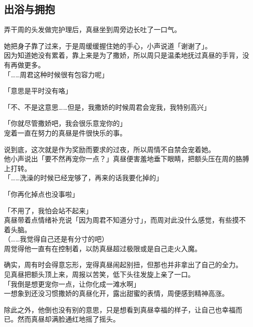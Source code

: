 \subsection{出浴与拥抱}

弄干周的头发做完护理后，真昼坐到周旁边长吐了一口气。

她把身子靠了过来，于是周缓缓握住她的手心，小声说道「谢谢了」。\\

因为知道她没有累着，靠上来是为了撒娇，所以周只是温柔地抚过真昼的手背，没有再做更多。\\

「……周君这种时候很有包容力呢」

「意思是平时没有咯」

「不、不是这意思……但是，我撒娇的时候周君会宠我，我特别高兴」

「你就尽管撒娇吧，我会很乐意宠你的」\\

宠着一直在努力的真昼是件很快乐的事。

说到底，这次就是作为奖励而要求的过夜，所以周情不自禁会宠着她。\\

他小声说出「要不然再宠你一点？」真昼便害羞地垂下眼睛，把额头压在周的胳膊上打转。\\

「……洗澡的时候已经宠够了，再来的话我要化掉的」

「你再化掉点也没事啦」

「不用了，我怕会站不起来」\\

真昼带着点情绪补充说「因为周君不知道分寸」，而周对此没什么感觉，有些摸不着头脑。\\

（……我觉得自己还是有分寸的吧）\\

周觉得他一直有在控制着，以防真昼超过极限或是自己走火入魔。

确实，周有时会得意忘形，宠得真昼闹起别扭，但那也并非拿出了自己的全力。\\

见真昼把额头顶上来，周报以苦笑，低下头往发旋上亲了一口。\\

「我倒是想更宠你一点，让你化成一滩水啊」\\

一想象到还没习惯撒娇的真昼化开，露出甜蜜的表情，周便感到精神高涨。

除此之外，他倒也没有别的意思，只是想看到真昼幸福的样子，让自己也幸福而已。然而真昼却满脸通红地摇了摇头。\\

